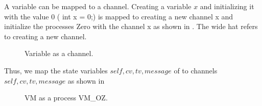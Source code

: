 A variable can be mapped to a channel. Creating a variable $x$ and initializing it with the value $0$ ( int x = 0;) is mapped to creating a new channel x and initialize the processes Zero with the channel x
as shown in . The wide hat refers to creating a new channel.
\begin{figure}[H]%
\centering
{}%
\hspace{1em}%
%
\caption{Variable as a channel.}
\label{tra_var}%
\end{figure}

Thus, we map the state variables $self, cv, tv, message$ of  to \picalc{} channels $self, cv, tv, message$ as shown in 

\begin{figure}[H]
\centering
{}
\caption{VM as a \picalc{} process VM\_OZ.}
\label{tra_var2}
\end{figure}
